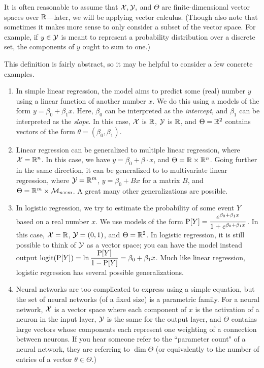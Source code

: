 \documentclass[12pt,twoside]{reedthesis}
\begin{document}
It is often reasonable to assume that $\cl X, \cl Y,$ and $\Theta$ are finite-dimensional vector spaces over $\R$—later, we will be applying vector calculus. (Though also note that sometimes it makes more sense to only consider a subset of the vector space. For example, if $y \in \cl Y$ is meant to represent a probability distribution over a discrete set, the components of $y$ ought to sum to one.)

This definition is fairly abstract, so it may be helpful to consider a few concrete examples.
\begin{enumerate}
    \item In simple linear regression, the model aims to predict some (real) number $y$ using a linear function of another number $x$. We do this using a models of the form $y = \beta_0 + \beta_1 x$. Here, $\beta_0$ can be interpreted as the \textit{intercept}, and $\beta_1$ can be interpreted as the \textit{slope}. In this case, $\cl X$ is $\R$, $\cl Y$ is $\R$, and $\Theta = \R^2$ contains vectors of the form $\theta = (\beta_0, \beta_1).$
    \item Linear regression can be generalized to multiple linear regression, where $\cl X = \R^n$. In this case, we have $y = \beta_0 + \beta \cdot x$, and $\Theta = \R \times \R^n$. Going further in the same direction, it can be generalized to to multivariate linear regression, where $\cl Y = \R^m$, $y=\beta_0 + Bx$ for a matrix $B$, and $\Theta = \R^m \times \cl M_{n \times m}$. A great many other generalizations are possible.
    \item In logistic regression, we try to estimate the probability of some event $Y$ based on a real number $x$. We use models of the form $\P[Y] = \dfrac{e^{\beta_0 + \beta_1 x}}{1 + e^{\beta_0 + \beta_1 x}}$. In this case, $\cl X = \R$, $\cl Y = (0, 1)$, and $\Theta = \R^2$. In logistic regression, it is still possible to think of $\cl Y$ as a vector space; you can have the model instead output $\logit(\P[Y]) = \ln\dfrac{\P[Y]}{1-\P[Y]} = \beta_0 + \beta_1 x$. Much like linear regression, logistic regression has several possible generalizations.
    \item Neural networks are too complicated to express using a simple equation, but the set of neural networks (of a fixed size) is a parametric family. For a neural network, $\cl{X}$ is a vector space where each component of $x$ is the activation of a neuron in the input layer, $\cl{Y}$ is the same for the output layer, and $\Theta$ contains large vectors whose components each represent one weighting of a connection between neurons. If you hear someone refer to the ``parameter count" of a neural network, they are referring to $\dim \Theta$ (or equivalently to the number of entries of a vector $\theta \in \Theta$.)
\end{enumerate}
\end{document}
